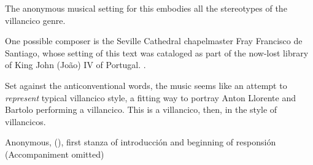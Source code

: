 
The anonymous musical setting for this embodies all the stereotypes of the
villancico genre.%
\begin{Footnote}
    One possible composer is the Seville Cathedral chapelmaster Fray Francisco
    de Santiago, whose setting of this text was cataloged as part of the
    now-lost library of King John (João) IV of Portugal. 
    \autocite[caixão 26, ]{JohnIV:Catalog}.
\end{Footnote}
Set against the anticonventional words, the music seems like an attempt to
\emph{represent} typical villancico style, a fitting way to portray Anton
Llorente and Bartolo performing a villancico.
This is a villancico, then, in the style of villancicos.


{Anonymous,  (), first
stanza of introducción and beginning of responsión (Accompaniment omitted)}

